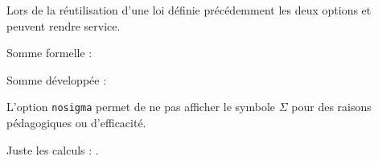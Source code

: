 \documentclass[12pt,a4paper]{article}
\begin{document}



Lors de la réutilisation d'une loi définie précédemment les deux options  et  peuvent rendre service.

\begin{latexex-flat}
Somme formelle :

Somme développée :

\end{latexex-flat}





L'option \verb#nosigma# permet de ne pas afficher le symbole $\Sigma$ pour des raisons pédagogiques ou d'efficacité.

\begin{latexex-flat}

\medskip

Juste les calculs :
 .
\end{latexex-flat}
\end{document}
